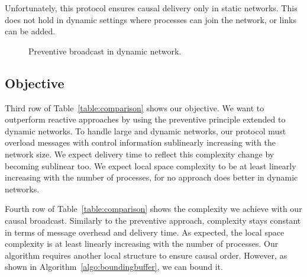 Unfortunately, this protocol ensures causal delivery only in static
networks. This does not hold in dynamic settings where processes can join the
network, or links can be added.

\begin{figure}
  \begin{center}
    
    \caption{\label{fig:problem}Preventive broadcast in dynamic network.}
  \end{center}
\end{figure}


\subsection{Objective}

Third row of Table~\ref{table:comparison} shows our objective. We want to
outperform reactive approaches by using the preventive principle extended to
dynamic networks. To handle large and dynamic networks, our protocol must
overload messages with control information sublinearly increasing with the
network size. We expect delivery time to reflect this complexity change by
becoming sublinear too. We expect local space complexity to be at least linearly
increasing with the number of processes, for no approach does better in dynamic
networks.

Fourth row of Table~\ref{table:comparison} shows the complexity we achieve with
our causal broadcast. Similarly to the preventive approach, complexity stays
constant in terms of message overhead and delivery time. As expected, the local
space complexity is at least linearly increasing with the number of
processes. Our algorithm requires another local structure to ensure causal
order. However, as shown in Algorithm~\ref{algo:boundingbuffer}, we can bound
it.




